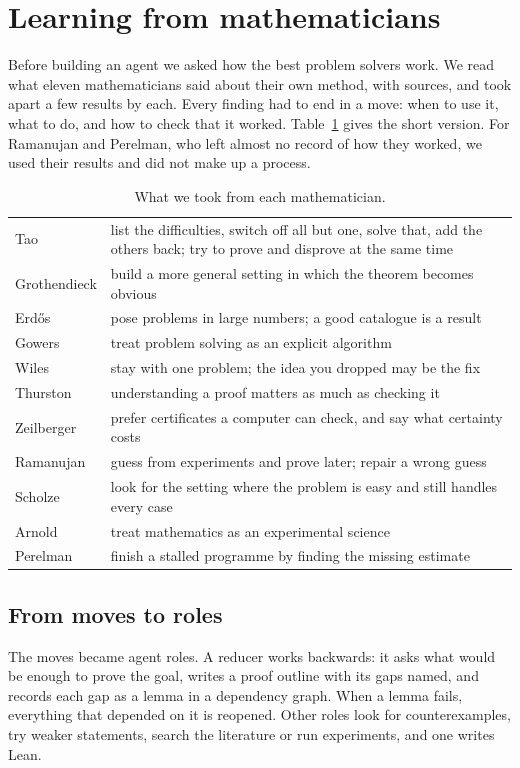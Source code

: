 \documentclass[11pt]{amsart}
\begin{document}
\section{Learning from mathematicians}\label{sec:math}

Before building an agent we asked how the best problem solvers work. We read what eleven mathematicians said about their own method, with sources, and took apart a few results by each. Every finding had to end in a move: when to use it, what to do, and how to check that it worked. Table~\ref{tab:moves} gives the short version. For Ramanujan and Perelman, who left almost no record of how they worked, we used their results and did not make up a process.

\begin{table}[ht]
\small
\begin{tabular}{@{}lp{}@{}}
\toprule
Tao & list the difficulties, switch off all but one, solve that, add the others back; try to prove and disprove at the same time\\
Grothendieck & build a more general setting in which the theorem becomes obvious\\
Erd\H{o}s & pose problems in large numbers; a good catalogue is a result\\
Gowers & treat problem solving as an explicit algorithm\\
Wiles & stay with one problem; the idea you dropped may be the fix\\
Thurston & understanding a proof matters as much as checking it\\
Zeilberger & prefer certificates a computer can check, and say what certainty costs\\
Ramanujan & guess from experiments and prove later; repair a wrong guess\\
Scholze & look for the setting where the problem is easy and still handles every case\\
Arnold & treat mathematics as an experimental science\\
Perelman & finish a stalled programme by finding the missing estimate\\
\bottomrule
\end{tabular}
\medskip
\caption{What we took from each mathematician.}\label{tab:moves}
\end{table}

\subsection*{From moves to roles} The moves became agent roles. A reducer works backwards: it asks what would be enough to prove the goal, writes a proof outline with its gaps named, and records each gap as a lemma in a dependency graph. When a lemma fails, everything that depended on it is reopened. Other roles look for counterexamples, try weaker statements, search the literature or run experiments, and one writes Lean.
\end{document}
